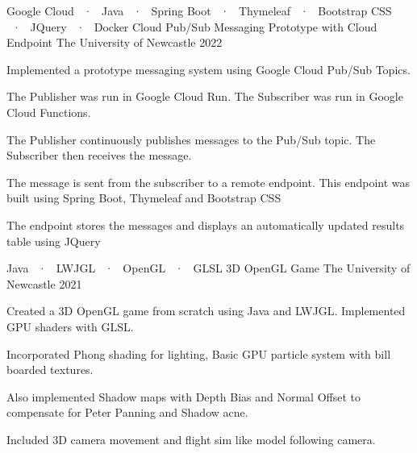 \begin{cventries}

  \cventry
  {Google Cloud ~·~ Java ~·~ Spring Boot ~·~ Thymeleaf ~·~ Bootstrap CSS ~·~ JQuery ~·~ Docker } %
  {Cloud Pub/Sub Messaging Prototype with Cloud Endpoint} %
  {The University of Newcastle} %
  {2022} %
  {
    \begin{cvitems} %
      \item {Implemented a prototype messaging system using Google Cloud Pub/Sub Topics.}
      \item {The Publisher was run in Google Cloud Run. The Subscriber was run in Google Cloud Functions.}
      \item {The Publisher continuously publishes messages to the Pub/Sub topic. The Subscriber then receives the message.}
      \item {The message is sent from the subscriber to a remote endpoint. This endpoint was built using Spring Boot, Thymeleaf and Bootstrap CSS}
      \item {The endpoint stores the messages and displays an automatically updated results table using JQuery}
    \end{cvitems}
  }

  \cventry
  {Java ~·~ LWJGL ~·~ OpenGL ~·~ GLSL} %
  {3D OpenGL Game} %
  {The University of Newcastle} %
  {2021} %
  {
    \begin{cvitems} %
      \item {Created a 3D OpenGL game from scratch using Java and LWJGL. Implemented GPU shaders with GLSL.}
      \item {Incorporated Phong shading for lighting, Basic GPU particle system with bill boarded textures.}
      \item {Also implemented Shadow maps with Depth Bias and Normal Offset to compensate for Peter Panning and Shadow acne.}
      \item {Included 3D camera movement and flight sim like model following camera.}
    \end{cvitems}
  }
\end{cventries}
